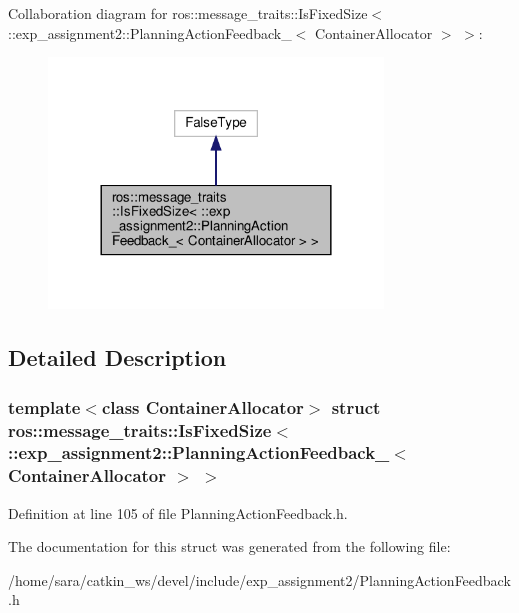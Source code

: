 Collaboration diagram for ros\+:\+:message\+\_\+traits\+:\+:Is\+Fixed\+Size$<$ \+:\+:exp\+\_\+assignment2\+:\+:Planning\+Action\+Feedback\+\_\+$<$ Container\+Allocator $>$ $>$\+:
\nopagebreak
\begin{figure}[H]
\begin{center}
\leavevmode
\includegraphics[width=252pt]{structros_1_1message__traits_1_1IsFixedSize_3_01_1_1exp__assignment2_1_1PlanningActionFeedback__7c737f863f8e96c2fde8d857b99c5d03}
\end{center}
\end{figure}


\subsection{Detailed Description}
\subsubsection*{template$<$class Container\+Allocator$>$\newline
struct ros\+::message\+\_\+traits\+::\+Is\+Fixed\+Size$<$ \+::exp\+\_\+assignment2\+::\+Planning\+Action\+Feedback\+\_\+$<$ Container\+Allocator $>$ $>$}



Definition at line 105 of file Planning\+Action\+Feedback.\+h.



The documentation for this struct was generated from the following file\+:\begin{DoxyCompactItemize}
\item 
/home/sara/catkin\+\_\+ws/devel/include/exp\+\_\+assignment2/Planning\+Action\+Feedback.\+h\end{DoxyCompactItemize}
